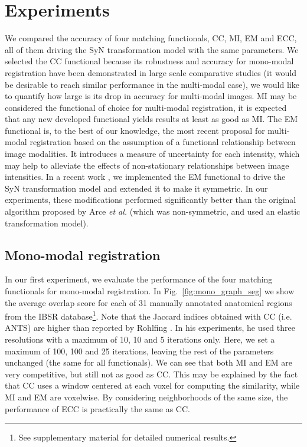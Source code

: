 \section{Experiments}
We compared the accuracy of four matching functionals, CC, MI, EM and ECC, all of them driving the SyN transformation model with the same parameters. We selected the CC functional because its robustness and accuracy for mono-modal registration have been demonstrated in large scale comparative studies \cite{Klein2009, Klein2010, Rohlfing2012} (it would be desirable to reach similar performance in the multi-modal case), we would like to quantify how large is its drop in accuracy for multi-modal images. MI \cite{Maes1997, Mattes2003} may be considered the functional of choice for multi-modal registration, it is expected that any new developed functional yields results at least as good as MI. The EM functional \cite{Arce-santana2014} is, to the best of our knowledge, the most recent proposal for multi-modal registration based on the assumption of a functional relationship between image modalities. It introduces a measure of uncertainty for each intensity, which may help to alleviate the effects of non-stationary relationships between image intensities. In a recent work \cite{Ocegueda2015}, we implemented the EM functional to drive the SyN transformation model and extended it to make it symmetric. In our experiments, these modifications performed significantly better than the original algorithm proposed by Arce {\it et al.} \cite{Arce-santana2014} (which was non-symmetric, and used an elastic transformation model).

\subsection{Mono-modal registration}
In our first experiment, we evaluate the performance of the four matching functionals for mono-modal registration. In \hbox{Fig. \ref{fig:mono_graph_seg}} we show the average overlap score for each of 31 manually annotated anatomical regions from the IBSR database\footnote{See supplementary material for detailed numerical results.}. Note that the Jaccard indices obtained with CC (i.e. ANTS) are higher than reported by Rohlfing \cite{Rohlfing2012}. In his experiments, he used three resolutions with a maximum of 10, 10 and 5 iterations only. Here, we set a maximum of 100, 100 and 25 iterations, leaving the rest of the parameters unchanged (the same for all functionals). We can see that both MI and EM are very competitive, but still not as good as CC. This may be explained by the fact that CC uses a window centered at each voxel for computing the similarity, while MI and EM are voxelwise. By considering neighborhoods of the same size, the performance of ECC is practically the same as CC.
%
%

